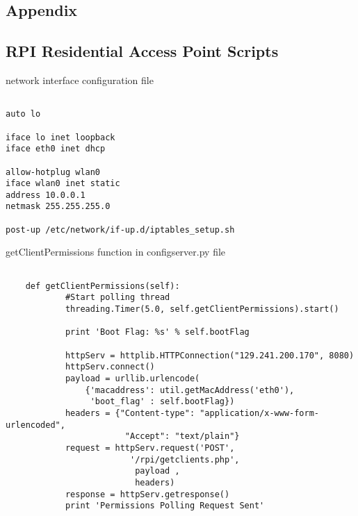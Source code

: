\appendix
{}
 \renewcommand{\chaptername}{\appendixname}
\begin{appendices}
\chapter{Appendix}
\label{chp:appendix}
\section{RPI Residential Access Point Scripts}

\begin{algorithm}[h]
  \caption{network interface configuration file}
  \label{code:network_interface}
  \begin{verbatim}
  
auto lo

iface lo inet loopback
iface eth0 inet dhcp

allow-hotplug wlan0
iface wlan0 inet static
address 10.0.0.1
netmask 255.255.255.0

post-up /etc/network/if-up.d/iptables_setup.sh
 \end{verbatim}
\end{algorithm}

\begin{algorithm}[h]
  \caption{getClientPermissions function in configserver.py file}
  \label{code:configserver_py}
  \begin{verbatim}

    def getClientPermissions(self):
            #Start polling thread
            threading.Timer(5.0, self.getClientPermissions).start()
            
            print 'Boot Flag: %s' % self.bootFlag
            
            httpServ = httplib.HTTPConnection("129.241.200.170", 8080)
            httpServ.connect()
            payload = urllib.urlencode(
	            {'macaddress': util.getMacAddress('eth0'),
	             'boot_flag' : self.bootFlag})
            headers = {"Content-type": "application/x-www-form-urlencoded",
            			"Accept": "text/plain"}
            request = httpServ.request('POST',
            			 '/rpi/getclients.php',
            			  payload ,
            			  headers)
            response = httpServ.getresponse()
            print 'Permissions Polling Request Sent'
            

\end{verbatim}
\end{algorithm}
\end{appendices}
